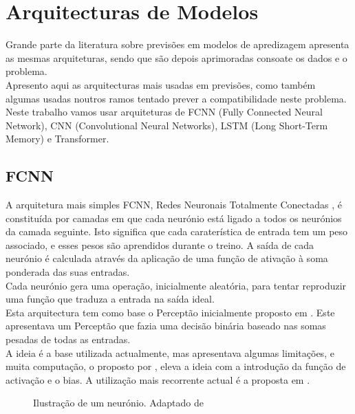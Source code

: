 \chapter{Arquitecturas de Modelos\label{ch:arquiteturas_modelos}}

Grande parte da literatura sobre previsões em modelos de apredizagem apresenta as mesmas arquiteturas, sendo que são depois aprimoradas consoate os dados e o problema. \\
Apresento aqui as arquitecturas mais usadas em previsões, como também algumas usadas noutros ramos tentado prever a compatibilidade neste problema. \\
Neste trabalho vamos usar arquiteturas de FCNN (Fully Connected Neural Network), CNN (Convolutional Neural Networks), LSTM (Long Short-Term Memory) e Transformer.\\




\section{FCNN\label{se:fcnn_sec}}

A arquitetura mais simples FCNN, Redes Neuronais Totalmente Conectadas , é constituída por camadas em que cada neurónio está ligado a todos os neurónios da camada seguinte. Isto significa que cada caraterística de entrada tem um peso associado, e esses pesos são aprendidos durante o treino. A saída de cada neurónio é calculada através da aplicação de uma função de ativação à soma ponderada das suas entradas.\\
Cada neurónio gera uma operação, inicialmente aleatória, para tentar reproduzir uma função que traduza a entrada na saída ideal.\\
Esta arquitectura tem como base o Perceptão inicialmente proposto em \cite{Rosenblatt1958}. Este apresentava um Perceptão que fazia uma decisão binária baseado nas somas pesadas de todas as entradas.\\
A ideia é a base utilizada actualmente, mas apresentava algumas limitações, e muita computação, o proposto por \cite{Minsky1969}, eleva a ideia com a introdução da função de activação e o bias. A utilização mais recorrente actual é a proposta em \cite{Haykin1999}.


\begin{figure}[H]
	\centering
	\resizebox{\linewidth}{!}{}
	\caption{Ilustração de um neurónio. Adaptado de \cite{Haykin1999}}
	\label{fig:neuronio}
\end{figure}



